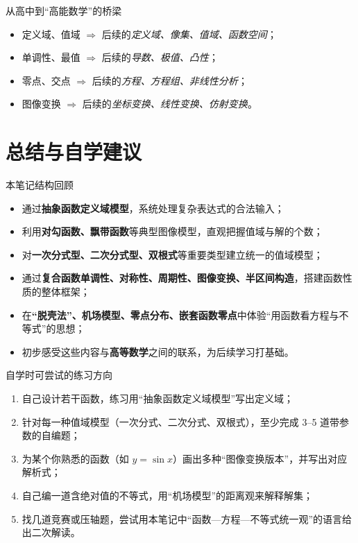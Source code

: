 \documentclass[a4paper,11pt]{ctexart}
\begin{document}
\begin{summarybox}[mathnote coverage=soft]{从高中到“高能数学”的桥梁}
  \begin{itemize}
    \item 定义域、值域 $\Rightarrow$ 后续的\emph{定义域、像集、值域、函数空间}；
    \item 单调性、最值 $\Rightarrow$ 后续的\emph{导数、极值、凸性}；
    \item 零点、交点 $\Rightarrow$ 后续的\emph{方程、方程组、非线性分析}；
    \item 图像变换 $\Rightarrow$ 后续的\emph{坐标变换、线性变换、仿射变换}。
  \end{itemize}
\end{summarybox}

\section{总结与自学建议}

\begin{summarybox}[mathnote coverage=line]{本笔记结构回顾}
  \begin{itemize}
    \item 通过\textbf{抽象函数定义域模型}，系统处理复杂表达式的合法输入；
    \item 利用\textbf{对勾函数、飘带函数}等典型图像模型，直观把握值域与解的个数；
    \item 对\textbf{一次分式型、二次分式型、双根式}等重要类型建立统一的值域模型；
    \item 通过\textbf{复合函数单调性、对称性、周期性、图像变换、半区间构造}，搭建函数性质的整体框架；
    \item 在\textbf{“脱壳法”、机场模型、零点分布、嵌套函数零点}中体验“用函数看方程与不等式”的思想；
    \item 初步感受这些内容与\textbf{高等数学}之间的联系，为后续学习打基础。
  \end{itemize}
\end{summarybox}

\begin{notebox}{自学时可尝试的练习方向}
  \begin{enumerate}
    \item 自己设计若干函数，练习用“抽象函数定义域模型”写出定义域；
    \item 针对每一种值域模型（一次分式、二次分式、双根式），至少完成 3--5 道带参数的自编题；
    \item 为某个你熟悉的函数（如 $y=\sin x$）画出多种“图像变换版本”，并写出对应解析式；
    \item 自己编一道含绝对值的不等式，用“机场模型”的距离观来解释解集；
    \item 找几道竞赛或压轴题，尝试用本笔记中“函数—方程—不等式统一观”的语言给出二次解读。
  \end{enumerate}
\end{notebox}
\end{document}
